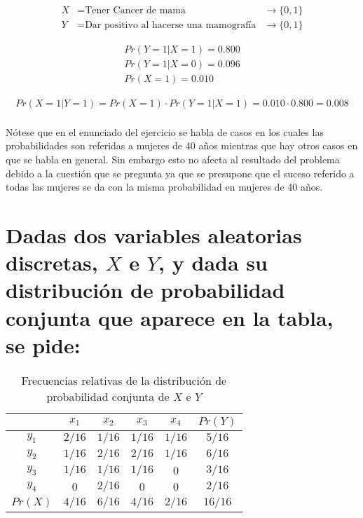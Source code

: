 \documentclass{article}
\begin{document}
		\begin{align}
			X &= \text{Tener Cancer de mama} 										&\rightarrow \{0,1\} \\
			Y &= \text{Dar positivo al hacerse una mamografía} 	&\rightarrow \{0,1\}
		\end{align}

		\begin{align}
			Pr(Y = 1 | X = 1) = 0.800 \\
			Pr(Y = 1 | X = 0) = 0.096 \\
			Pr(X = 1) = 0.010
		\end{align}

		\begin{align}
			Pr(X = 1 | Y = 1) = Pr(X = 1) \cdot Pr(Y = 1 | X = 1) = 0.010 \cdot 0.800 = 0.008
		\end{align}

		\paragraph{}
		Nótese que en el enunciado del ejercicio se habla de casos en los cuales las probabilidades son referidas a mujeres de 40 años mientras que hay otros casos en que se habla en general. Sin embargo esto no afecta al resultado del problema debido a la cuestión que se pregunta ya que se presupone que el suceso referido a todas las mujeres se da con la misma probabilidad en mujeres de 40 años.

	\section{Dadas dos variables aleatorias discretas, $X$ e $Y$, y dada su distribución de probabilidad conjunta que aparece en la tabla, se pide:}
	\label{sec:e2}

	\begin{table}
		\centering
		\begin{tabular}{ | c || c | c | c | c | c |}
			\hline
			 					& $x_1$ 	& $x_2$ 	& $x_3$ 	& $x_4$ 	& $Pr(Y)$ \\ \hline \hline
				$y_1$ 	&	$2/16$	&	$1/16$	&	$1/16$	&	$1/16$	&	$5/16$ 	\\ \hline
				$y_2$ 	&	$1/16$	&	$2/16$	&	$2/16$	&	$1/16$	&	$6/16$ 	\\ \hline
				$y_3$ 	&	$1/16$	&	$1/16$	&	$1/16$	&	$0$			&	$3/16$ 	\\ \hline
				$y_4$ 	&	$0$			&	$2/16$	&	$0$			&	$0$			&	$2/16$ 	\\ \hline
				$Pr(X)$ &	$4/16$	&	$6/16$	&	$4/16$	&	$2/16$	&	$16/16$ \\
			 \hline
		\end{tabular}
		\caption{Frecuencias relativas de la distribución de probabilidad conjunta de $X$ e $Y$}
		\label{table:e2}

	\end{table}
\end{document}
